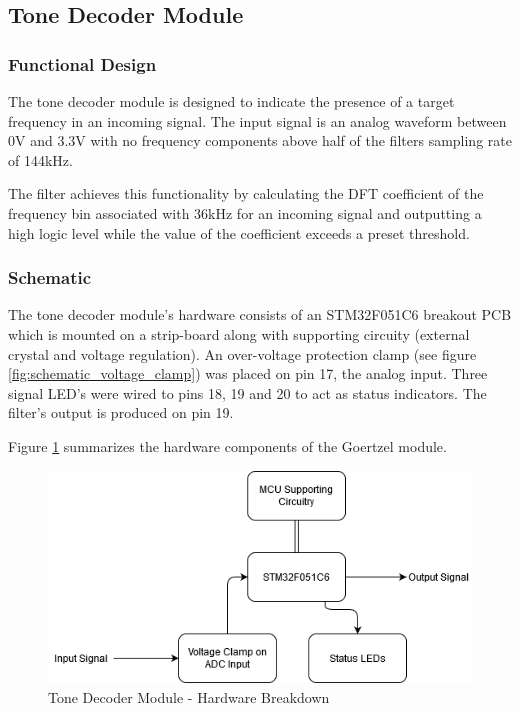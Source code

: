 



\subsection{Tone Decoder Module}
\label{sec:tone_decoder_hardware}

\subsubsection{Functional Design}
The tone decoder module is designed to indicate the presence of a target frequency in an incoming signal. The input signal is an analog waveform between 0V and 3.3V with no frequency components above half of the filters sampling rate of 144kHz.

The filter achieves this functionality by calculating the DFT coefficient of the frequency bin associated with 36kHz for an incoming signal and outputting a high logic level while the value of the coefficient exceeds a preset threshold.

\subsubsection{Schematic}
The tone decoder module's hardware consists of an STM32F051C6 breakout PCB which is mounted on a strip-board along with supporting circuity (external crystal and voltage regulation). An over-voltage protection clamp (see figure \ref{fig:schematic_voltage_clamp}) was placed on pin 17, the analog input. Three signal LED's were wired to pins 18, 19 and 20 to act as status indicators. The filter's output is produced on pin 19.

Figure \ref{fig:goertzel_schematic_block_form} summarizes the hardware components of the Goertzel module.

\begin{figure}[H]
	\centering
	\includegraphics[width=.8\textwidth]{figures/design/goertzel_schematic_block_form.png}
	\caption{Tone Decoder Module - Hardware Breakdown}
	\label{fig:goertzel_schematic_block_form}
\end{figure}

